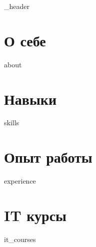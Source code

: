 \documentclass[letter, 14pt]{article}
\author{Илья Казаков}
\begin{document}
{_header}
\vspace*{1pt}

\hline
\vspace*{10pt}

\section{О себе}\label{sec:-}
\vspace*{3pt}
{about}
\vspace*{10pt}

\section{Навыки}\label{sec:}
\vspace*{3pt}
{skills}
\vspace*{10pt}

\section{Опыт работы}\label{sec:-2}
\vspace*{3pt}
{experience}
\vspace*{10pt}

\section{IT курсы}\label{sec:2}
\vspace*{3pt}
{it_courses}
\vspace*{10pt}
\end{document}
